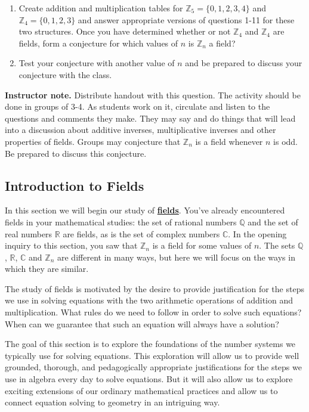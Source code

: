 \documentclass[11pt]{article}
\newcommand\smallnote[1]
	{\begin{mdframed}\raggedright  {\bf Instructor note.} {#1} \end{mdframed}}
\newenvironment{task}
	{\begin{mdframed}[linecolor=lightgray, linewidth=3pt]\raggedright}
	{\end{mdframed}}
\renewcommand\emph[1]{\underline{\bf{#1}}} %
\theoremstyle{definition}
\begin{document}
\begin{task}
\begin{enumerate}
      \item Create addition and multiplication tables for $\mathbb{Z}_5 = \{0,1,2,3,4\}$ and $\mathbb{Z}_4=\{0,1,2,3\}$ and answer
        appropriate versions of questions 1-11 for these two structures. Once you have determined whether or not $\mathbb{Z}_4$ and 
        $\mathbb{Z}_4$ are fields, form a conjecture for which values of $n$ is $\mathbb{Z}_n$ a field?
      \item Test your conjecture with another value of $n$ and be prepared to discuss your conjecture with the class.
    \end{enumerate}
\end{task}

\smallnote{
Distribute handout with this question. The activity should be done in groups of 3-4. As students work on it, circulate and listen to the 
questions and comments they make. They may say and do things that will lead into a discussion about additive inverses, multiplicative 
inverses and other properties of fields. Groups may conjecture that $\mathbb{Z}_n$ is a field whenever $n$ is odd. Be prepared to discuss
this conjecture.} 

\subsection{Introduction to Fields}

In this section we will begin our study of \emph{fields}. You've already encountered fields in your mathematical studies: the set of rational numbers $\mathbb{Q}$ 
and the set of real numbers $\mathbb{R}$ are fields, as is the set of complex numbers $\mathbb{C}$. In the opening inquiry to this section, you saw that
$\mathbb{Z}_n$ is a field for some values of $n$. The sets $\mathbb{Q}$, $\mathbb{R}$, $\mathbb{C}$ and $\mathbb{Z}_n$ are 
different in many ways, but here we will focus on the ways in which they are similar. 

The study of fields is motivated by the desire to provide justification for the steps we use in solving equations with the two arithmetic operations of
addition and multiplication. What rules do we need to follow in order to solve such equations? When can we guarantee that such an equation will always 
have a solution?

The goal of this section is to explore the foundations of the number systems we typically use for solving equations. This exploration will allow us to provide 
well grounded, thorough, and pedagogically appropriate justifications for the steps we use in algebra every day to solve equations. But it will also allow 
us to explore exciting extensions of our ordinary mathematical practices and allow us to connect equation solving to geometry in an intriguing way.
\end{document}
